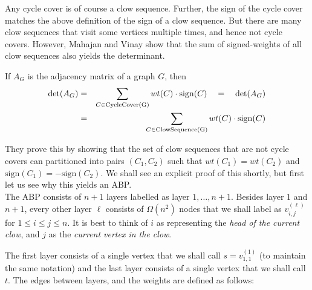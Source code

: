 Any cycle cover is of course a clow sequence. Further, the sign of the cycle cover matches the above definition of the sign of a clow sequence. But there are many clow sequences that visit some vertices multiple times, and hence not cycle covers. However, Mahajan and Vinay show that the sum of signed-weights of all clow sequences also yields the determinant. 

\begin{lemma}[\cite{mv97}]\label{lem:mv-clowseq} If $A_G$ is the adjacency matrix of a graph $G$, then
\begin{eqnarray*}
\det(A_G) & = &  \sum_{C \in \mathrm{CycleCover(G)}} wt(C) \cdot \mathrm{sign}(C) \quad = \quad \det(A_G)\\
& = & \sum_{C \in \mathrm{ClowSequence(G)}} wt(C) \cdot \mathrm{sign}(C)
\end{eqnarray*}
\end{lemma}

They prove this by showing that the set of clow sequences that are not cycle covers can partitioned into pairs $(C_1,C_2)$ such that $wt(C_1) = wt(C_2)$ and $\mathrm{sign}(C_1) = - \mathrm{sign}(C_2)$. We shall see an explicit proof of this shortly, but first let us see why this yields an ABP. \\

The ABP consists of $n+1$ layers labelled as layer $1,\dots, n+1$. Besides layer $1$ and $n+1$, every other layer $\ell$ consists of $\Omega(n^2)$ nodes that we shall label as $v_{i,j}^{(\ell)}$ for $1\leq i\leq j\leq n$. It is best to think of $i$ as representing the \emph{head of the current clow}, and $j$ as the \emph{current vertex in the clow}. 

The first layer consists of a single vertex that we shall call $s = v_{1,1}^{(1)}$ (to maintain the same notation)  and the last layer consists of a single vertex that we shall call $t$. The edges between layers, and the weights are defined as follows:

